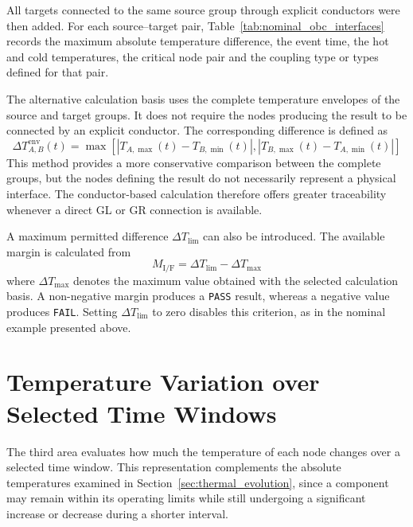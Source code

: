 All targets connected to the same source group through explicit conductors
were then added. For each source--target pair,
Table~\ref{tab:nominal_obc_interfaces} records the maximum absolute
temperature difference, the event time, the hot and cold temperatures, the
critical node pair and the coupling type or types defined for that pair.


\NominalOBCInterfaceTable[0.8\textwidth]

The alternative calculation basis uses the complete temperature envelopes of
the source and target groups. It does not require the nodes producing the
result to be connected by an explicit conductor. The corresponding difference is
defined as
\begin{equation}
    \Delta T_{A,B}^{\mathrm{env}}(t)
    =
    \max\!\left[
        \left|T_{A,\max}(t)-T_{B,\min}(t)\right|,
        \left|T_{B,\max}(t)-T_{A,\min}(t)\right|
    \right]
    \label{eq:if_group_envelope}
\end{equation}
This method provides a more conservative comparison between the complete
groups, but the nodes defining the result do not necessarily represent a
physical interface. The conductor-based calculation therefore offers greater
traceability whenever a direct GL or GR connection is available.

A maximum permitted difference \(\Delta T_{\mathrm{lim}}\) can also be
introduced. The available margin is calculated from
\begin{equation}
    M_{\mathrm{I/F}}
    =
    \Delta T_{\mathrm{lim}}
    -
    \Delta T_{\max}
    \label{eq:if_margin}
\end{equation}
where \(\Delta T_{\max}\) denotes the maximum value obtained with the selected
calculation basis. A non-negative margin produces a \texttt{PASS} result,
whereas a negative value produces \texttt{FAIL}. Setting
\(\Delta T_{\mathrm{lim}}\) to zero disables this criterion, as in the
nominal example presented above.

\FloatBarrier

\section{Temperature Variation over Selected Time Windows}
\label{sec:temperature_time_windows}

The third area evaluates how much the temperature of each node changes over a
selected time window. This representation complements the absolute
temperatures examined in Section~\ref{sec:thermal_evolution}, since a
component may remain within its operating limits while still undergoing a
significant increase or decrease during a shorter interval.

